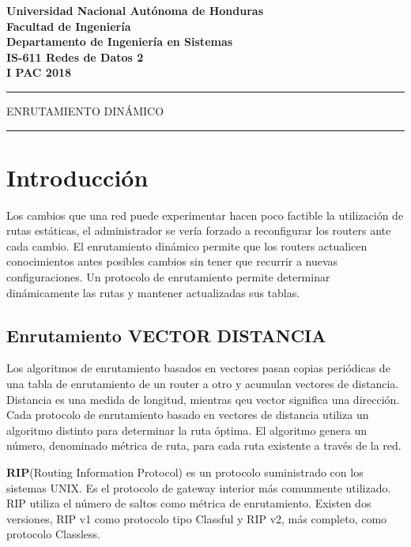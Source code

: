 \documentclass[12pt]{article}
\begin{document}
\begin{center}
\bfseries{Universidad Nacional Autónoma de Honduras}\\
Facultad de Ingeniería\\
Departamento de Ingeniería en Sistemas\\
\bigskip
\bigskip
IS-611 Redes de Datos 2\\
I PAC 2018

\noindent\rule{\textwidth}{1pt}
\huge{ENRUTAMIENTO DINÁMICO}
\noindent\rule{\textwidth}{1pt}
\end{center}
 
 \section{Introducción}   
Los cambios que una red puede experimentar hacen poco factible la utilización de rutas estáticas, el administrador se vería forzado a reconfigurar los routers ante cada cambio. El enrutamiento dinámico permite que los routers actualicen conocimientos antes posibles cambios sin tener que recurrir a nuevas configuraciones. Un protocolo de enrutamiento permite determinar dinámicamente las rutas y mantener actualizadas sus tablas.

 \subsection{Enrutamiento VECTOR DISTANCIA}
Los algoritmos de enrutamiento basados en vectores pasan copias periódicas de una tabla de enrutamiento de un router a otro y acumulan vectores de distancia. Distancia es una medida de longitud, mientras qeu vector significa una dirección. Cada protocolo de enrutamiento basado en vectores de distancia utiliza un algoritmo distinto para determinar la ruta óptima. El algoritmo genera un número, denominado métrica de ruta, para cada ruta existente a través de la red. 

\textbf{RIP}(Routing Information Protocol) es un protocolo suministrado con los sistemas UNIX. Es el protocolo de gateway interior más comunmente utilizado. RIP utiliza el número de saltos como métrica de enrutamiento. Existen dos versiones, RIP v1 como protocolo tipo Classful y RIP v2, más completo, como protocolo Classless.
\end{document}
